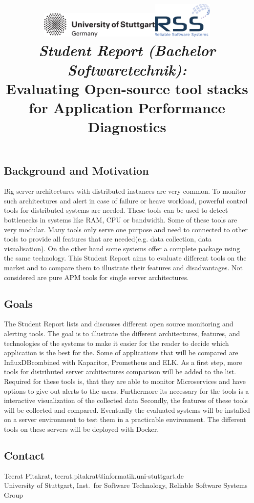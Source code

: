 \documentclass[a4paper,12pt]{article}
\date{}
\title{
\includegraphics[width=6cm]{figures/stuttgart-vector.pdf}\hfill{\includegraphics[width=3cm]{figures/rss_logo.pdf}}
\quad \\ [0.5cm]
{\large \textit{Student Report (Bachelor Softwaretechnik):}} \\ [1mm]
{\Large Evaluating Open-source tool stacks for Application Performance Diagnostics}
}
\begin{document}
	

\maketitle

\thispagestyle{empty}

\vspace{-2.5cm}


\subsection*{Background and Motivation}
Big server architectures with distributed instances are very common. To monitor such architectures and alert in case of failure or heave workload, powerful control tools for distributed systems are needed. These tools can be used to detect bottlenecks in systems like RAM, CPU or bandwidth. Some of these tools are very modular. Many tools only serve one purpose and need to connected to other tools to provide all features that are needed(e.g. data collection, data visualisation). On the other hand some systems offer a complete package using the same technology.
This Student Report aims to evaluate different tools on the market and to compare them to illustrate their features and disadvantages. 
Not considered are pure APM tools for single server architectures\cite{Heger2017}.

\subsection*{Goals}
The Student Report lists and discusses different open source monitoring and alerting tools. The goal is to illustrate the different architectures, features, and technologies of the systems to make it easier for the reader to decide which application is the best for the.
Some of applications that will be compared are InfluxDB\cite{InfluxDB}combined with Kapacitor, Prometheus\cite{Prometheus}  and ELK. As a first step, more tools for distributed server architectures comparison will be added to the list. Required for these tools is, that they are able to monitor Microservices and have options to give out alerts to the users. Furthermore its necessary for the tools is a interactive visualization of the collected data
Secondly, the features of these tools will be collected and compared. Eventually the evaluated systems will be installed on a server environment to test them in a practicable environment. The different tools on these servers will be deployed with Docker.


\begin{scriptsize}


\end{scriptsize}

\subsection*{Contact}
Teerat Pitakrat, teerat.pitakrat@informatik.uni-stuttgart.de \\
University of Stuttgart, Inst.\ for Software Technology, Reliable Software Systems Group \\
\end{document}
